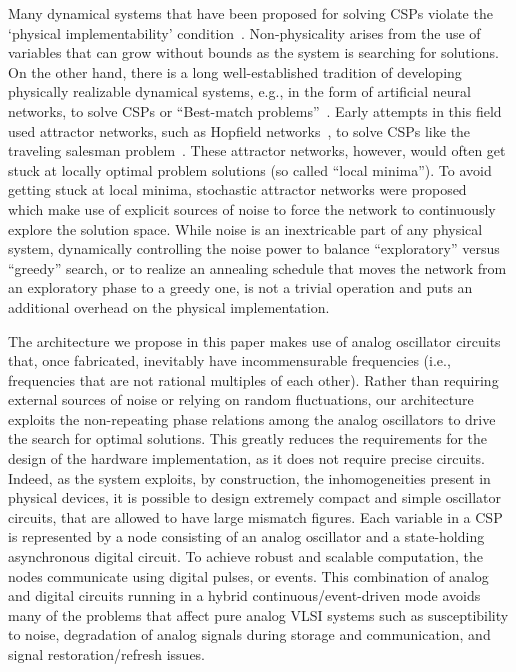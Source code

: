 \documentclass[10pt]{article}
\begin{document}
Many dynamical systems 
 that have been proposed for solving CSPs violate the `physical implementability' condition~\cite{Zhang_Constantinides92,Nagamatu_Yanaru96,Ercsey-Ravasz_Toroczkai11}. Non-physicality arises from the use of variables that can grow without bounds as the system is searching for solutions. On the other hand, there is a long well-established tradition of developing physically realizable dynamical systems, e.g., in the form of artificial neural networks, to solve CSPs or ``Best-match problems''~\cite{Minsky_Papert69,Rumelhart_McClelland86}. Early attempts in this field used attractor networks, such as Hopfield networks~\cite{Hopfield82}, to solve CSPs like the traveling salesman problem~\cite{Hopfield_Tank85,Hopfield_Tank86}. These attractor networks, however, would often get stuck at locally optimal problem solutions (so called ``local minima''). To avoid getting stuck at local minima,  stochastic attractor networks were proposed~\cite{Habenschuss_etal13,Maass14} which make use of explicit sources of noise to force the network to continuously explore the solution space.
While noise is an inextricable part of any physical system, dynamically controlling the noise power to balance ``exploratory'' versus ``greedy'' search, or  to realize an annealing schedule that moves the network from an exploratory phase to a greedy one, is not a trivial  operation and puts an additional overhead on the physical implementation. 

The architecture we propose in this paper makes use of analog oscillator circuits that, once fabricated, inevitably have incommensurable frequencies (i.e., frequencies that are not rational multiples of each other). Rather than requiring external sources of noise or relying on random fluctuations, our architecture exploits the non-repeating phase relations among the analog oscillators to drive the search for optimal solutions. This greatly reduces the requirements for the design of the hardware implementation, as it does not require precise circuits. Indeed, as the system exploits, by construction,  the inhomogeneities  present in physical devices, it is possible to design extremely compact and simple oscillator circuits, that are allowed to have large mismatch figures. Each variable in a CSP is represented by a node consisting of an analog oscillator and a state-holding asynchronous digital circuit. To achieve robust and scalable computation, the nodes communicate using digital pulses, or events. This combination of analog and digital circuits running in a hybrid continuous/event-driven mode avoids many of the problems that affect pure analog VLSI systems such as susceptibility to noise, degradation of analog signals during storage and communication, and signal restoration/refresh issues.
\end{document}
